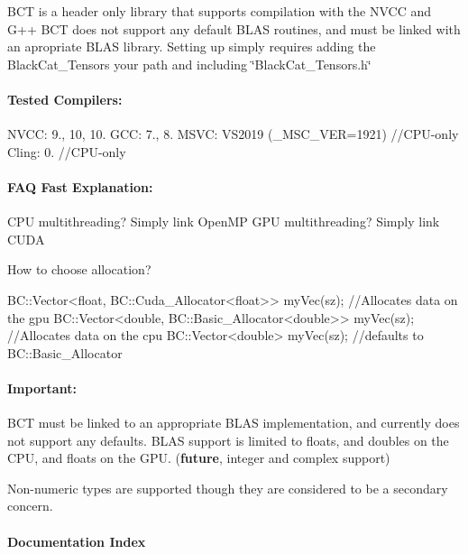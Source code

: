 B\+CT is a header only library that supports compilation with the N\+V\+CC and G++ B\+CT does not support any default B\+L\+AS routines, and must be linked with an apropriate B\+L\+AS library. Setting up simply requires adding the Black\+Cat\+\_\+\+Tensors your path and including \char`\"{}\+Black\+Cat\+\_\+\+Tensors.\+h\char`\"{}

\paragraph*{Tested Compilers\+:}

N\+V\+CC\+: 9., 10, 10. G\+CC\+: 7., 8. M\+S\+VC\+: V\+S2019 (\+\_\+\+M\+S\+C\+\_\+\+V\+ER=1921) //\+C\+P\+U-\/only Cling\+: 0. //\+C\+P\+U-\/only

\paragraph*{F\+AQ Fast Explanation\+:}

C\+PU multithreading? Simply link Open\+MP G\+PU multithreading? Simply link C\+U\+DA

How to choose allocation?


\begin{DoxyCode}
BC::Vector<float, BC::Cuda\_Allocator<float>> myVec(sz);    \textcolor{comment}{//Allocates data on the gpu}
BC::Vector<double, BC::Basic\_Allocator<double>> myVec(sz); \textcolor{comment}{//Allocates data on the cpu}
BC::Vector<double>  myVec(sz);                             \textcolor{comment}{//defaults to BC::Basic\_Allocator}
\end{DoxyCode}


\paragraph*{Important\+:}

B\+CT must be linked to an appropriate B\+L\+AS implementation, and currently does not support any defaults. B\+L\+AS support is limited to floats, and doubles on the C\+PU, and floats on the G\+PU. ({\bfseries future}, integer and complex support)

Non-\/numeric types are supported though they are considered to be a secondary concern.

\paragraph*{Documentation Index}

